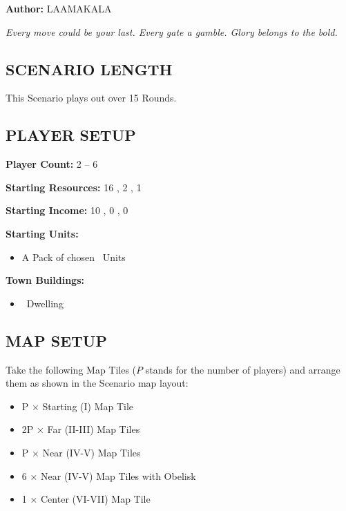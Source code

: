 
\begin{multicols*}{2}

\textbf{Author:} LAAMAKALA

\textit{Every move could be your last. Every gate a gamble. Glory belongs to the bold.}

\subsection*{\MakeUppercase{Scenario Length}}
This Scenario plays out over 15 Rounds.

\subsection*{\MakeUppercase{Player Setup}}
\textbf{Player Count:} 2 -- 6

\textbf{Starting Resources:} 16 , 2 , 1 

\textbf{Starting Income:} 10 , 0 , 0 

\textbf{Starting Units:}

\begin{itemize}
  \item A Pack of chosen \bronze\ Units
\end{itemize}

\textbf{Town Buildings:}
\begin{itemize}
  \item \bronze\ Dwelling
\end{itemize}

\subsection*{\MakeUppercase{Map Setup}}
Take the following Map Tiles ($P$ stands for the number of players) and arrange them as shown in the Scenario map layout:

\begin{itemize}
  \item P × Starting (I) Map Tile
  \item 2P × Far (II-III) Map Tiles
  \item P × Near (IV-V) Map Tiles
  \item 6 × Near (IV-V) Map Tiles with Obelisk
  \item 1 × Center (VI-VII) Map Tile
\end{itemize}


\end{multicols*}
